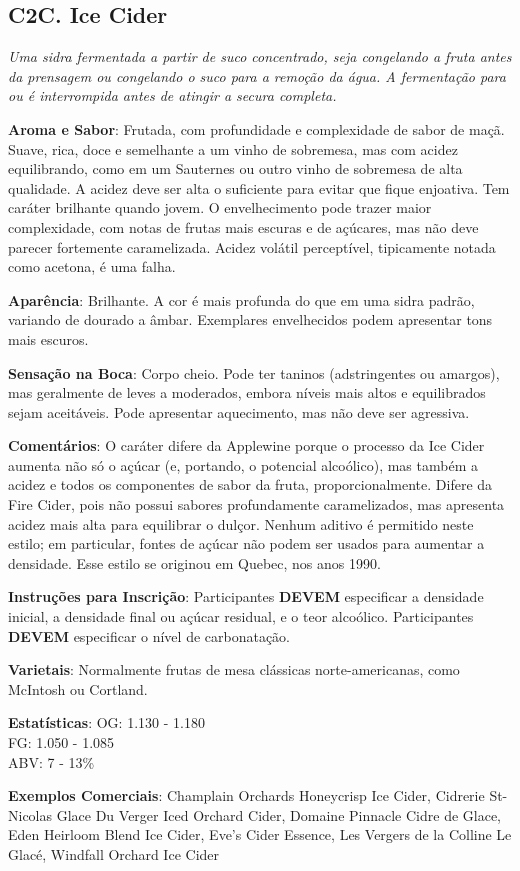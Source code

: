\subsection*{C2C. Ice Cider}

\textit{Uma sidra fermentada a partir de suco concentrado, seja congelando a fruta antes da prensagem ou congelando o suco para a remoção da água. A fermentação para ou é interrompida antes de atingir a secura completa.}

\textbf{Aroma e Sabor}: Frutada, com profundidade e complexidade de sabor de maçã. Suave, rica, doce e semelhante a um vinho de sobremesa, mas com acidez equilibrando, como em um Sauternes ou outro vinho de sobremesa de alta qualidade. A acidez deve ser alta o suficiente para evitar que fique enjoativa. Tem caráter brilhante quando jovem. O envelhecimento pode trazer maior complexidade, com notas de frutas mais escuras e de açúcares, mas não deve parecer fortemente caramelizada. Acidez volátil perceptível, tipicamente notada como acetona, é uma falha.

\textbf{Aparência}: Brilhante. A cor é mais profunda do que em uma sidra padrão, variando de dourado a âmbar. Exemplares envelhecidos podem apresentar tons mais escuros.

\textbf{Sensação na Boca}: Corpo cheio. Pode ter taninos (adstringentes ou amargos), mas geralmente de leves a moderados, embora níveis mais altos e equilibrados sejam aceitáveis. Pode apresentar aquecimento, mas não deve ser agressiva.

\textbf{Comentários}: O caráter difere da Applewine porque o processo da Ice Cider aumenta não só o açúcar (e, portando, o potencial alcoólico), mas também a acidez e todos os componentes de sabor da fruta, proporcionalmente. Difere da Fire Cider, pois não possui sabores profundamente caramelizados, mas apresenta acidez mais alta para equilibrar o dulçor. Nenhum aditivo é permitido neste estilo; em particular, fontes de açúcar não podem ser usados para aumentar a densidade. Esse estilo se originou em Quebec, nos anos 1990.

\textbf{Instruções para Inscrição}: Participantes \textbf{DEVEM} especificar a densidade inicial, a densidade final ou açúcar residual, e o teor alcoólico. Participantes \textbf{DEVEM} especificar o nível de carbonatação. 

\textbf{Varietais}: Normalmente frutas de mesa clássicas norte-americanas, como McIntosh ou Cortland.

\textbf{Estatísticas}: OG: 1.130 - 1.180 \\
\phantom{ } \hspace{16.5mm} FG: 1.050 - 1.085 \\
\phantom{ } \hspace{16.5mm} ABV: 7 - 13\%

\textbf{Exemplos Comerciais}: Champlain Orchards Honeycrisp Ice Cider, Cidrerie St-Nicolas Glace Du Verger Iced Orchard Cider, Domaine Pinnacle Cidre de Glace, Eden Heirloom Blend Ice Cider, Eve's Cider Essence, Les Vergers de la Colline Le Glacé, Windfall Orchard Ice Cider
